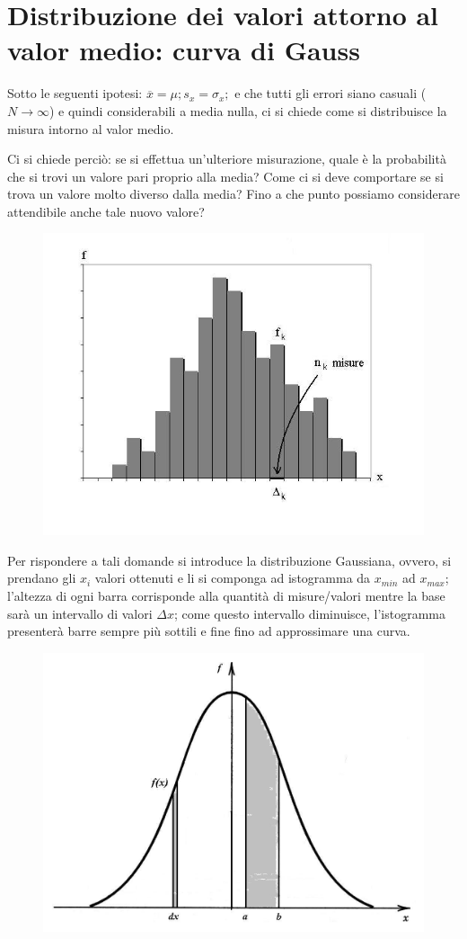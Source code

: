 \documentclass[a4paper, 15pt]{article}
\begin{document}
 \section{Distribuzione dei valori attorno al valor medio: curva di Gauss}
 \begin{adjustwidth}{2in}{}	
 	Sotto le seguenti ipotesi: \(\overline{x} = \mu; s_x = \sigma_x; \) e che tutti gli errori siano casuali ($N\rightarrow\infty$) e quindi considerabili a media nulla, ci si chiede come si distribuisce la misura intorno al valor medio. \newline
	
 	Ci si chiede perciò: se si effettua un’ulteriore misurazione, quale è la probabilità che si trovi un valore pari proprio alla media? Come ci si deve comportare se si trova un valore molto diverso dalla media? Fino a che punto possiamo considerare attendibile anche tale nuovo valore? 
 \begin{figure}[H]
	\centering
	\includegraphics[width=0.5\linewidth]{fig/screenshot001}
	\label{fig:screenshot001}
\end{figure} 	
 	Per rispondere a tali domande si introduce la distribuzione Gaussiana, ovvero, si prendano gli $x_i$ valori ottenuti e li si componga ad istogramma da $x_{min}$ ad $x_{max}$; l'altezza di ogni barra corrisponde alla quantità di misure/valori mentre la base sarà un intervallo di valori $\Delta x$; come questo intervallo diminuisce, l'istogramma presenterà barre sempre più sottili e fine fino ad approssimare una curva.  	
 	\begin{figure}[H]
 		\centering
 		\includegraphics[width=0.5\linewidth]{fig/screenshot002}

\end{figure}
\end{adjustwidth}
\end{document}
